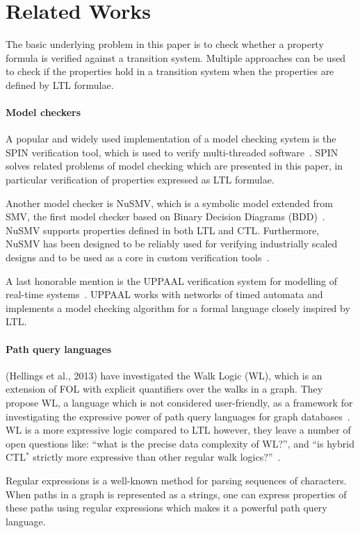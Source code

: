 \section{Related Works}\label{sec:related-works}
The basic underlying problem in this paper is to check whether a property formula is verified against a transition system. Multiple approaches can be used to check if the properties hold in a transition system when the properties are defined by LTL formulae.

\paragraph{Model checkers}
A popular and widely used implementation of a model checking system is the SPIN verification tool, which is used to verify multi-threaded software~\cite{spin}. SPIN solves related problems of model checking which are presented in this paper, in particular verification of properties expressed as LTL formulae.

Another model checker is NuSMV, which is a symbolic model extended from SMV, the first model checker based on Binary Decision Diagrams (BDD)~\cite{nusmv}. NuSMV supports properties defined in both LTL and CTL. Furthermore, NuSMV has been designed to be reliably used for verifying industrially scaled designs and to be used as a core in custom verification tools~\cite{nusmv}.

A last honorable mention is the UPPAAL verification system for modelling of real-time systems~\cite{uppaal}. UPPAAL works with networks of timed automata and implements a model checking algorithm for a formal language closely inspired by LTL.

\paragraph{Path query languages}
(Hellings et al., 2013)\cite{hellings2013walk} have investigated the Walk Logic (WL), which is an extension of FOL with explicit quantifiers over the walks in a graph. They propose WL, a language which is not considered user-friendly, as a framework for investigating the expressive power of path query languages for graph databases~\cite{hellings2013walk}. WL is a more expressive logic compared to LTL however, they leave a number of open questions like: ``what is the precise data complexity of WL?'', and ``is hybrid CTL$^\ast$ strictly more expressive than other regular walk logics?''~\cite{hellings2013walk}.

Regular expressions is a well-known method for parsing sequences of characters. When paths in a graph is represented as a strings, one can express properties of these paths using regular expressions which makes it a powerful path query language. 

